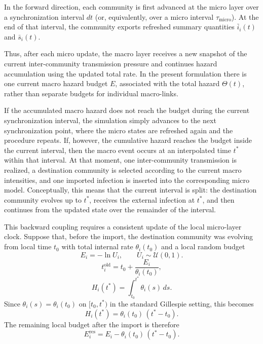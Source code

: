 \documentclass[a4paper,fleqn]{cas-sc}
\begin{document}
In the forward direction, each community is first advanced at the micro layer over a synchronization interval \(dt\) (or, equivalently, over a micro interval \(\tau_{\mathrm{micro}}\)). At the end of that interval, the community exports refreshed summary quantities \(\bar{i}_i(t)\) and \(\bar{s}_i(t)\).

Thus, after each micro update, the macro layer receives a new snapshot of the current inter-community transmission pressure and continues hazard accumulation using the updated total rate. In the present formulation there is one current macro hazard budget \(E\), associated with the total hazard \(\Theta(t)\), rather than separate budgets for individual macro-links.

If the accumulated macro hazard does not reach the budget during the current synchronization interval, the simulation simply advances to the next synchronization point, where the micro states are refreshed again and the procedure repeats. If, however, the cumulative hazard reaches the budget inside the current interval, then the macro event occurs at an interpolated time \(t^\ast\) within that interval. At that moment, one inter-community transmission is realized, a destination community is selected according to the current macro intensities, and one imported infection is inserted into the corresponding micro model. Conceptually, this means that the current interval is split: the destination community evolves up to \(t^\ast\), receives the external infection at \(t^\ast\), and then continues from the updated state over the remainder of the interval.

This backward coupling requires a consistent update of the local micro-layer clock. Suppose that, before the import, the destination community was evolving from local time \(t_0\) with total internal rate \(\theta_i(t_0)\) and a local random budget
\[
E_i=-\ln U_i, \qquad U_i\sim \mathcal U(0,1).
\]
\[
t_i^{\mathrm{old}}=t_0+\frac{E_i}{\theta_i(t_0)},
\]
\[
H_i(t^\ast)=\int_{t_0}^{t^\ast}\theta_i(s)\,ds.
\]
Since \(\theta_i(s)=\theta_i(t_0)\) on \([t_0,t^\ast)\) in the standard Gillespie setting, this becomes
\[
H_i(t^\ast)=\theta_i(t_0)\,(t^\ast-t_0).
\]
The remaining local budget after the import is therefore
\[
E_i^{\mathrm{res}}=E_i-\theta_i(t_0)\,(t^\ast-t_0).
\]
\end{document}
